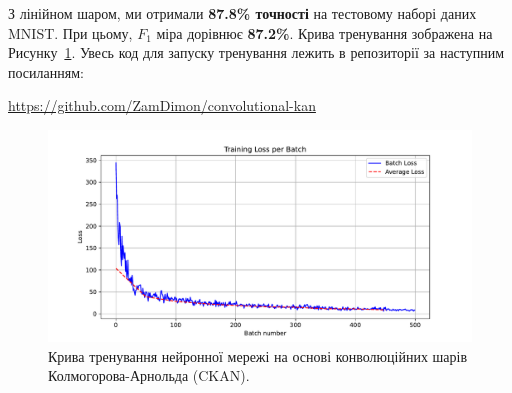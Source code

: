 З лінійном шаром, ми отримали \textbf{87.8\% точності} на тестовому наборі 
даних MNIST. При цьому, $F_1$ міра дорівнює \textbf{87.2\%}. Крива 
тренування зображена на Рисунку~\ref{fig:train-curve}. Увесь код для 
запуску тренування лежить в репозиторії за наступним посиланням:
\begin{center}
    \url{https://github.com/ZamDimon/convolutional-kan}
\end{center}
\begin{figure}
    \centering
    \includegraphics[width=\textwidth]{figures/batch_loss_curve.pdf}
    \caption{Крива тренування нейронної мережі на основі конволюційних шарів 
    Колмогорова-Арнольда (CKAN).}
    \label{fig:train-curve}
\end{figure}
